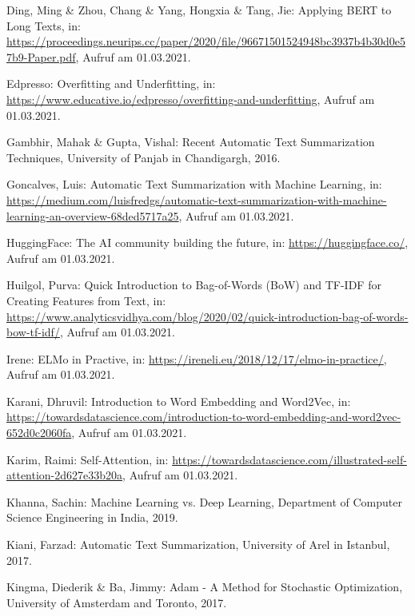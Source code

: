 \begin{thebibliography}{85}
Ding, Ming \& Zhou, Chang \& Yang, Hongxia \& Tang, Jie: Applying BERT to Long Texts, in: \url{https://proceedings.neurips.cc/paper/2020/file/96671501524948bc3937b4b30d0e57b9-Paper.pdf}, Aufruf am 01.03.2021.

Edpresso: Overfitting and Underfitting, in: \url{https://www.educative.io/edpresso/overfitting-and-underfitting}, Aufruf am 01.03.2021.

Gambhir, Mahak \& Gupta, Vishal: Recent Automatic Text Summarization Techniques, University of Panjab in Chandigargh, 2016.

Goncalves, Luis: Automatic Text Summarization with Machine Learning, in: \url{https://medium.com/luisfredgs/automatic-text-summarization-with-machine-learning-an-overview-68ded5717a25}, Aufruf am 01.03.2021.

HuggingFace: The AI community building the future, in: \url{https://huggingface.co/}, Aufruf am 01.03.2021.

Huilgol, Purva: Quick Introduction to Bag-of-Words (BoW) and TF-IDF for Creating Features from Text, in: \url{https://www.analyticsvidhya.com/blog/2020/02/quick-introduction-bag-of-words-bow-tf-idf/}, Aufruf am 01.03.2021.

Irene: ELMo in Practive, in: \url{https://ireneli.eu/2018/12/17/elmo-in-practice/}, Aufruf am 01.03.2021.

Karani, Dhruvil: Introduction to Word Embedding and Word2Vec, in: \url{https://towardsdatascience.com/introduction-to-word-embedding-and-word2vec-652d0c2060fa}, Aufruf am 01.03.2021.

Karim, Raimi: Self-Attention, in: \url{https://towardsdatascience.com/illustrated-self-attention-2d627e33b20a}, Aufruf am 01.03.2021.

Khanna, Sachin: Machine Learning vs. Deep Learning, Department of Computer Science Engineering in India, 2019.

Kiani, Farzad: Automatic Text Summarization, University of Arel in Istanbul, 2017.

Kingma, Diederik \& Ba, Jimmy: Adam - A Method for Stochastic Optimization, University of Amsterdam and Toronto, 2017.


\end{thebibliography}
